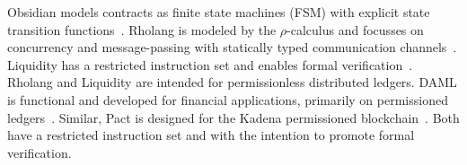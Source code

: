 Obsidian models contracts as finite state machines (FSM) with explicit state transition functions~\cite{Coblenz2017}.
Rholang is modeled by the $\rho$-calculus and focusses on concurrency and message-passing with statically typed communication channels~\cite{Meredith2018}.
Liquidity has a restricted instruction set and enables formal verification~\cite{OCamlProSAS2018}.
Rholang and Liquidity are intended for permissionless distributed ledgers.
DAML is functional and developed for financial applications, primarily on permissioned ledgers~\cite{Meier2018}.
Similar, Pact is designed for the Kadena permissioned blockchain~\cite{Popejoy2017}.
Both have a restricted instruction set and with the intention to promote formal verification.


